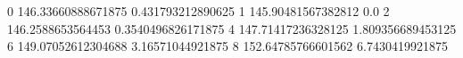 0 146.33660888671875 0.431793212890625
1 145.90481567382812 0.0
2 146.2588653564453 0.3540496826171875
4 147.71417236328125 1.809356689453125
6 149.07052612304688 3.16571044921875
8 152.64785766601562 6.7430419921875

